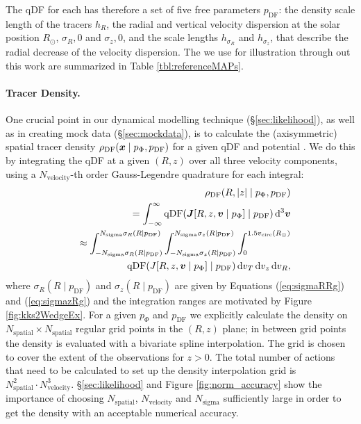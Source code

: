 The qDF for each \MAP has therefore a set of five free parameters $p_\text{DF}$: the density scale length of the tracers $h_R$, the radial and vertical velocity dispersion at the solar position $R_\odot$, $\sigma_R,0$ and $\sigma_z,0$, and the scale lengths $h_{\sigma_R}$ and $h_{\sigma_z}$, that describe the radial decrease of the velocity dispersion. The \MAPs we use for illustration through out this work are summarized in Table \ref{tbl:referenceMAPs}.

\paragraph{Tracer Density.} One crucial point in our dynamical modelling technique (\S\ref{sec:likelihood}), as well as in creating mock data (\S\ref{sec:mockdata}), is to calculate the (axisymmetric) spatial tracer density $\rho_\text{DF}(\boldsymbol{x} \mid p_{\Phi},p_\text{DF})$ for a given qDF and potential . We do this by integrating the qDF at a given $(R,z)$ over all three velocity components, using a $N_\text{velocity}$-th order Gauss-Legendre quadrature for each integral:
\begin{eqnarray}
&&\rho_\text{DF}(R,|z| \mid p_{\Phi},p_\text{DF}) \nonumber\\
&&= \int_{-\infty}^{\infty} \text{qDF}(\boldsymbol{J}[R,z,\boldsymbol{v} \mid p_{\Phi}] \mid p_\text{DF}) \mathop{}\!\mathrm{d^3}\boldsymbol{v}  \label{eq:tracerdensity_general}\\
&&\approx \int_{-N_\text{sigma} \sigma_R(R \mid p_\text{DF})}^{N_\text{sigma} \sigma_R(R \mid p_\text{DF})} \int_{-N_\text{sigma}\sigma_z(R \mid p_\text{DF})}^{N_\text{sigma} \sigma_z(R \mid p_\text{DF})} \int_{0}^{1.5 v_\text{circ}(R_\odot)}  \nonumber\\
& & \hspace{1cm} \text{qDF}(J[R,z,\boldsymbol{v} \mid p_{\Phi}] \mid p_\text{DF}) \mathop{}\!\mathrm{d} v_T \mathop{}\!\mathrm{d} v_z \mathop{}\!\mathrm{d} v_R, \label{eq:tracerdensity}
\end{eqnarray}
where $\sigma_R(R \mid p_\text{DF})$ and $\sigma_z(R \mid p_\text{DF})$ are given by Equations (\ref{eq:sigmaRRg}) and (\ref{eq:sigmazRg}) and the integration ranges are motivated by Figure \ref{fig:kks2WedgeEx}. For a given $p_\Phi$ and $p_\text{DF}$ we explicitly calculate the density on $N_\text{spatial} \times N_\text{spatial}$ regular grid points in the $(R,z)$ plane; in between grid points the density is evaluated with a bivariate spline interpolation. The grid is chosen to cover the extent of the observations for $z>0$. The total number of actions that need to be calculated to set up the density interpolation grid is $N_\text{spatial}^2 \cdot N_\text{velocity}^3$. \S\ref{sec:likelihood} and Figure \ref{fig:norm_accuracy} show the importance of choosing $N_\text{spatial}$, $N_\text{velocity}$ and $N_\text{sigma}$ sufficiently large in order to get the density with an acceptable numerical accuracy. 

